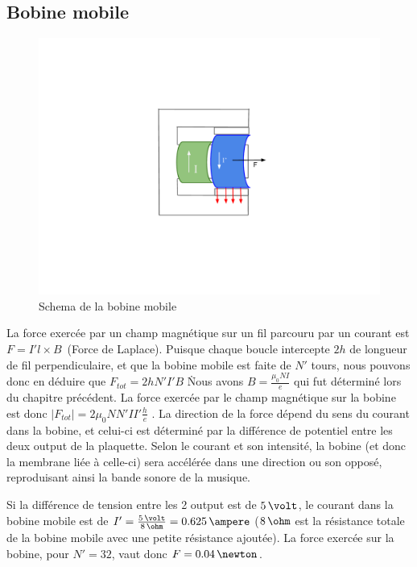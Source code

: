 \subsection{Bobine mobile}

\begin{figure}	
\begin{center}
\includegraphics[scale=0.5]{img/bobine-mobile}
\end{center}
\caption{Schema de la bobine mobile}		
\label{fig:bobinemobile}		
\end{figure}

La force exercée par un champ magnétique sur un fil parcouru par un courant est $F =  I' l \times B$\, (Force de Laplace). Puisque 
chaque boucle intercepte $2h$ de longueur de fil perpendiculaire, et que la bobine mobile est faite de $N'$ tours, nous pouvons
donc en déduire que $F_{tot} = 2 h N' I' B$ \. Nous avons $B = \frac{\mu_0 N I}{e}$ qui fut déterminé 
lors du chapitre précédent. La force exercée par le champ magnétique sur la bobine est donc 
$ |F_{tot}| = 2 \mu_0 N N' I I' \frac{h}{e}$ . La direction de la force dépend du sens du courant dans la bobine, et 
celui-ci est déterminé par la différence de potentiel entre les deux output de la plaquette. Selon le courant et son
intensité, la bobine (et donc la membrane liée à celle-ci) sera accélérée dans une direction ou son opposé, reproduisant 
ainsi la bande sonore de la musique.

Si la différence de tension entre les 2 output est de $5\,\volt$, le courant dans la bobine mobile est de 
$I' = \frac{5\,\volt}{8\,\ohm} = 0.625\,\ampere$ ($8\,\ohm$ est la résistance totale de la bobine mobile avec une petite 
résistance ajoutée). La force exercée sur la bobine,
pour $N'=32$, vaut donc $F = 0.04\,\newton$.

